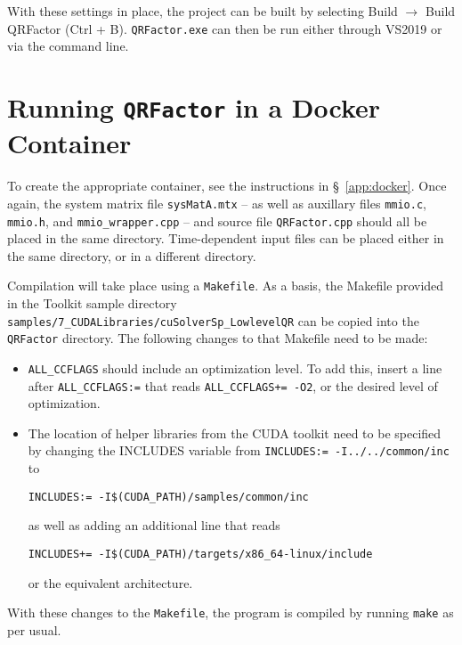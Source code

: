 \documentclass[11pt,letterpaper]{article}
\begin{document}
With these settings in place, the project can be built by selecting Build $\to$ Build QRFactor (Ctrl + B). \texttt{QRFactor.exe} can then be run either through VS2019 or via the command line.

\section{Running \texttt{QRFactor} in a Docker Container}
\label{sec: docker}

To create the appropriate container, see the instructions in \S~\!\ref{app:docker}. Once again,
the system matrix file \verb+sysMatA.mtx+ -- as well as auxillary files \verb+mmio.c+, \verb+mmio.h+, 
and \verb+mmio_wrapper.cpp+ -- and source file \verb+QRFactor.cpp+ should all be placed in the
same directory. Time-dependent input files can be placed either in the same directory, or in a different directory.

Compilation will take place using a \verb+Makefile+. As a basis, the Makefile provided in the Toolkit sample 
directory \verb+samples/7_CUDALibraries/cuSolverSp_LowlevelQR+ can be copied into the \verb+QRFactor+ directory. The following
changes to that Makefile need to be made:
\begin{itemize}
  \item \verb+ALL_CCFLAGS+ should include an optimization level. To add this, insert a line after \verb+ALL_CCFLAGS:=+ that
  reads \verb.ALL_CCFLAGS+= -O2., or the desired level of optimization.
  \item The location of helper libraries from the CUDA toolkit need to be specified by changing the 
  INCLUDES variable from \verb_INCLUDES:= -I../../common/inc_ to
  \begin{center}
    \verb+INCLUDES:= -I$(CUDA_PATH)/samples/common/inc+
  \end{center} 
  as well as adding an additional line that reads 
  \begin{center}
    \verb.INCLUDES+= -I$(CUDA_PATH)/targets/x86_64-linux/include.
  \end{center} 
  or the equivalent architecture.
\end{itemize}

With these changes to the \verb+Makefile+, the program is compiled by running \verb+make+ as per usual.

\end{document}
